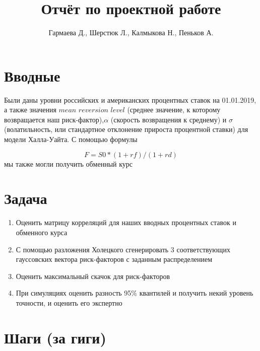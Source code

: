 \documentclass{article}
\title{Отчёт по проектной работе}
\author{Гармаева Д., Шерстюк Л., Калмыкова Н., Пеньков А.}
\date{}
\begin{document}
\maketitle

\section{Вводные}

Были даны уровни российских и американских процентных ставок на 01.01.2019, а также значения $\textit{mean reversion level}$ (среднее значение, к которому возвращается наш риск-фактор),$\alpha$ (скорость возвращения к среднему) и $\sigma$ (волатильность, или стандартное отклонение прироста процентной ставки) для модели Халла-Уайта. С помощью формулы 

$$F = S0*(1+rf)/(1+rd)$$ мы также могли получить обменный курс

\section{Задача}

\begin{enumerate}
    \item Оценить матрицу корреляций для наших вводных процентных ставок и обменного курса
    \item С помощью разложения Холецкого сгенерировать 3 соответствующих гауссовских вектора риск-факторов с заданным распределением
    \item Оценить максимальный скачок для риск-факторов
    \item При симуляциях оценить разность 95$\%$ квантилей и получить некий уровень точности, и оценить его экспертно
\end{enumerate}

\section{Шаги (за гиги)}
\end{document}
